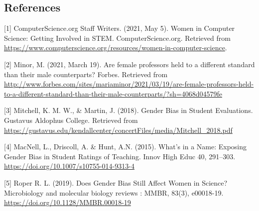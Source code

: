 \documentclass[
]{article}
\begin{document}
\clearpage

\hypertarget{references}{%
\subsection{References}\label{references}}

{[}1{]} ComputerScience.org Staff Writers. (2021, May 5). Women in
Computer Science: Getting Involved in STEM. ComputerScience.org.
Retrieved from
\url{https://www.computerscience.org/resources/women-in-computer-science}.

{[}2{]} Minor, M. (2021, March 19). Are female professors held to a
different standard than their male counterparts? Forbes. Retrieved from
\url{http://www.forbes.com/sites/mariaminor/2021/03/19/are-female-professors-held-to-a-different-standard-than-their-male-counterparts/?sh=4068d04579fe}

{[}3{]} Mitchell, K. M. W., \& Martin, J. (2018). Gender Bias in Student
Evaluations. Gustavus Aldophus College. Retrieved from
\url{https://gustavus.edu/kendallcenter/concertFiles/media/Mitchell_2018.pdf}

{[}4{]} MacNell, L., Driscoll, A. \& Hunt, A.N. (2015). What's in a
Name: Exposing Gender Bias in Student Ratings of Teaching. Innov High
Educ 40, 291--303. \url{https://doi.org/10.1007/s10755-014-9313-4}

{[}5{]} Roper R. L. (2019). Does Gender Bias Still Affect Women in
Science? Microbiology and molecular biology reviews : MMBR, 83(3),
e00018-19. \url{https://doi.org/10.1128/MMBR.00018-19}
\end{document}
